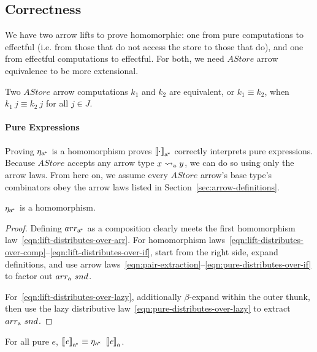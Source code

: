 \subsection{Correctness}

We have two arrow lifts to prove homomorphic: one from pure computations to effectful (i.e. from those that do not access the store to those that do), and one from effectful computations to effectful.
For both, we need $AStore$ arrow equivalence to be more extensional.

\begin{definition}
Two $AStore$ arrow computations $k_1$ and $k_2$ are equivalent, or $k_1 \equiv k_2$, when $k_1~j \equiv k_2~j$ for all $j \in J$.
\end{definition}

\paragraph{Pure Expressions}
Proving $\eta_\mathrm{a^{\mspace{-2mu}*}}$ is a homomorphism proves $\left\llbracket{\cdot}\right\rrbracket_\mathrm{a^{\mspace{-2mu}*}}$ correctly interprets pure expressions.
Because $AStore$ accepts any arrow type $x \rightsquigarrow_\mathrm{a} y$, we can do so using only the arrow laws.
From here on, we assume every $AStore$ arrow's base type's combinators obey the arrow laws listed in Section~\ref{sec:arrow-definitions}.

\begin{theorem}
$\eta_\mathrm{a^{\mspace{-2mu}*}}$ is a homomorphism.
\end{theorem}
\begin{proof}
Defining $arr_\mathrm{a^{\mspace{-2mu}*}}$ as a composition clearly meets the first homomorphism law~\eqref{eqn:lift-distributes-over-arr}.
For homomorphism laws~\eqref{eqn:lift-distributes-over-comp}--\eqref{eqn:lift-distributes-over-if}, start from the right side, expand definitions, and use arrow laws~\eqref{eqn:pair-extraction}--\eqref{eqn:pure-distributes-over-if} to factor out $arr_\mathrm{a}~snd$.

For~\eqref{eqn:lift-distributes-over-lazy}, additionally $\beta$-expand within the outer thunk, then use the lazy distributive law~\eqref{eqn:pure-distributes-over-lazy} to extract $arr_\mathrm{a}~snd$.
\end{proof}

\begin{corollary}
\label{cor:pure-astore-semantic-correctness}
For all pure $\mathit{e}$, $\left\llbracket{\mathit{e}}\right\rrbracket_\mathrm{a^{\mspace{-2mu}*}} \equiv \eta_\mathrm{a^{\mspace{-2mu}*}}~\left\llbracket{\mathit{e}}\right\rrbracket_\mathrm{a}$.
\end{corollary}

